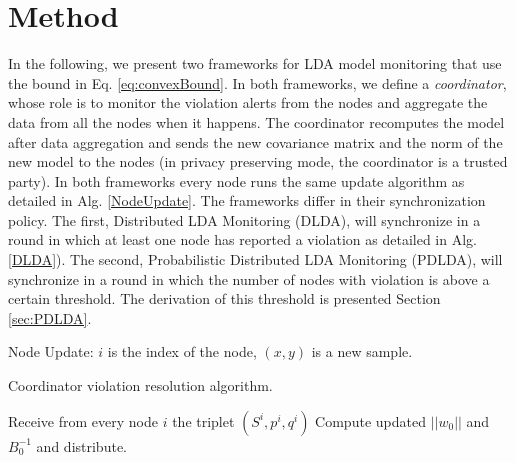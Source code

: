\section{Method}
In the following, we present two frameworks for LDA model monitoring that use
the bound in Eq. \ref{eq:convexBound}. 
In both frameworks, 
we define a \textit{coordinator}, whose role is to monitor the violation alerts from the nodes and aggregate the data from all the nodes when it happens. The coordinator recomputes the model after data aggregation and sends the new covariance matrix and the norm of the new model to the nodes (in privacy preserving mode, the coordinator is a trusted party).
In both frameworks every node runs the same
update algorithm as detailed in Alg. \ref{NodeUpdate}.
The frameworks differ in their synchronization policy. %
The first, Distributed LDA Monitoring (DLDA), will synchronize in a round
in which at least one node has reported a violation as detailed in Alg.
\ref{DLDA}).
The second, Probabilistic Distributed LDA Monitoring (PDLDA), will synchronize in
a round in which the number of nodes with violation is above a certain
threshold.
The derivation of this threshold is presented Section \ref{sec:PDLDA}.


\begin{algorithm}
\caption{Node Update: $i$ is the index of the node, $(x,y)$ is a new sample.}
\label{NodeUpdate}
\end{algorithm}

\begin{algorithm}
\caption{Coordinator violation resolution algorithm.}\label{DLDA}
\begin{algorithmic}[1]
\State Receive from every node $i$ the triplet $(S^i,p^i,q^i)$
\State Compute updated $||w_0||$ and $B_0^{-1}$ and distribute.
\EndIf
\EndProcedure
\end{algorithmic}
\end{algorithm}

